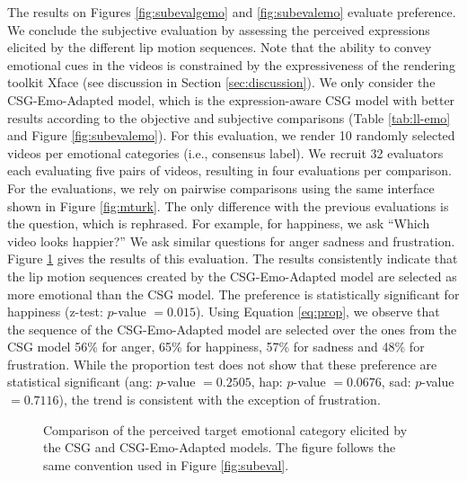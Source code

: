 \documentclass[10pt,journal,compsoc]{IEEEtran}
\begin{document}
The results on Figures \ref{fig:subevalgemo} and \ref{fig:subevalemo} evaluate preference. We conclude the subjective evaluation by assessing the perceived expressions elicited by the different lip motion sequences. 
Note that the ability to convey emotional cues in the videos is constrained by the expressiveness of the rendering toolkit Xface (see discussion in Section \ref{sec:discussion}). We only consider the CSG-Emo-Adapted model, which is the expression-aware CSG model with better results according to the objective and subjective comparisons (Table \ref{tab:ll-emo} and Figure \ref{fig:subevalemo}). For this evaluation, we render 10 randomly selected videos per emotional categories (i.e., consensus label). We recruit 32 evaluators each evaluating five pairs of videos, resulting in four evaluations per comparison. For the evaluations, we rely on pairwise comparisons using the same interface shown in Figure \ref{fig:mturk}. The only difference with the previous evaluations is the question, which is rephrased. For example, for happiness, we ask ``Which video looks happier?'' We ask similar questions for anger sadness and frustration. Figure \ref{fig:subemo} gives the results of this evaluation. The results consistently indicate that the lip motion sequences created by the CSG-Emo-Adapted model are selected as more emotional than the CSG model. The preference is statistically significant for happiness (z-test: $p$-value $=0.015$). Using Equation \ref{eq:prop}, we observe that the sequence of the CSG-Emo-Adapted model are selected over the ones from the CSG model 56\% for anger, 65\% for happiness, 57\% for sadness and 48\% for frustration. While the proportion test does not show that these preference are statistical significant (ang: $p$-value $=0.2505$, hap: $p$-value $=0.0676$, sad: $p$-value $=0.7116$), the trend is consistent with the exception of frustration. 


\begin{figure}
	\centering
	\caption{Comparison of the perceived target emotional category elicited by the CSG and CSG-Emo-Adapted models. The figure follows the same convention used in Figure \ref{fig:subeval}.}
	\label{fig:subemo}
\end{figure}
\end{document}
